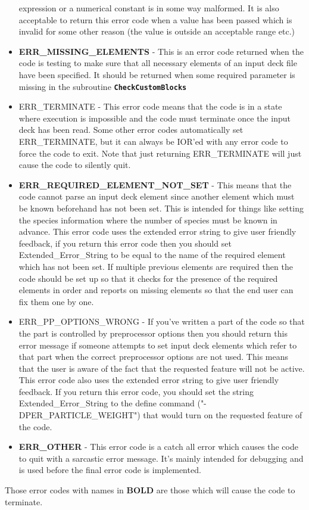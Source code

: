 \documentclass[12pt]{article}
\newcommand{\inlinecode}[1]{{\color{warwickred} \bf\texttt{#1}}}
\begin{document}
\begin{itemize}
  expression or a numerical constant is in some way malformed. It is also
  acceptable to return this error code when a value has been passed which is
  invalid for some other reason (the value is outside an acceptable range etc.)
\item {\bf ERR\_MISSING\_ELEMENTS} - This is an error code returned when the
  code is testing to make sure that all necessary elements of an input deck
  file have been specified. It should be returned when some required parameter
  is missing in the subroutine \inlinecode{CheckCustomBlocks}
\item ERR\_TERMINATE - This error code means that the code is in a state where
  execution is impossible and the code must terminate once the input deck has
  been read. Some other error codes automatically set ERR\_TERMINATE, but it
  can always be IOR'ed with any error code to force the code to exit. Note that
  just returning ERR\_TERMINATE will just cause the code to silently quit.
\item {\bf ERR\_REQUIRED\_ELEMENT\_NOT\_SET} - This means that the code cannot
  parse an input deck element since another element which must be known
  beforehand has not been set. This is intended for things like setting the
  species information where the number of species must be known in
  advance. This error code uses the extended error string to give user friendly
  feedback, if you return this error code then you should set
  Extended\_Error\_String to be equal to the name of the required element which
  has not been set. If multiple previous elements are required then the code
  should be set up so that it checks for the presence of the required elements
  in order and reports on missing elements so that the end user can fix them
  one by one.
\item ERR\_PP\_OPTIONS\_WRONG - If you've written a part of the code so that
  the part is controlled by preprocessor options then you should return this
  error message if someone attempts to set input deck elements which refer to
  that part when the correct preprocessor options are not used. This means that
  the user is aware of the fact that the requested feature will not be
  active. This error code also uses the extended error string to give user
  friendly feedback. If you return this error code, you should set the string
  Extended\_Error\_String to the define command ("-DPER\_PARTICLE\_WEIGHT")
  that would turn on the requested feature of the code.
\item {\bf ERR\_OTHER} - This error code is a catch all error which causes the
  code to quit with a sarcastic error message. It's mainly intended for
  debugging and is used before the final error code is implemented.
\end{itemize}

Those error codes with names in {\bf BOLD} are those which will cause the code
to terminate.
\end{document}
